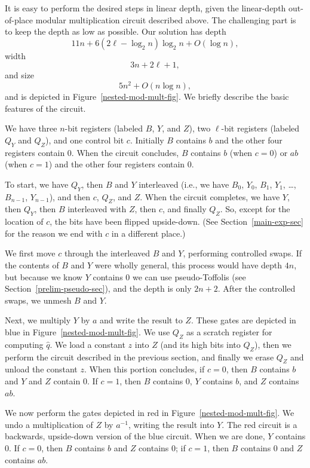 \documentclass{article} %
\begin{document}
It is easy to perform the desired steps in linear depth, given
the linear-depth out-of-place modular multiplication
circuit described above.  The challenging part is to keep the
depth as low as possible.  Our solution has depth
$$
11n + 6 (2\ell - \log_2 n) \log_2 n + O(\log n),
$$
width
$$
3n + 2\ell + 1,
$$
and size
$$
5n^2 + O(n \log n),
$$
and is depicted in Figure~\ref{nested-mod-mult-fig}.  We briefly
describe the basic features of the circuit.

We have three $n$-bit registers (labeled $B$, $Y$, and $Z$),
two $\ell$-bit registers (labeled $Q_Y$ and $Q_Z$), and one
control bit $c$.  Initially $B$ contains $b$ and the other
four registers contain $0$.  When the circuit concludes,
$B$ contains $b$ (when $c=0$) or $ab$ (when $c=1$) and the
other four registers contain $0$.

To start, we have $Q_Y$, then $B$ and $Y$ interleaved (i.e.,
we have $B_0$, $Y_0$, $B_1$, $Y_1$, \dots, $B_{n-1}$, $Y_{n-1}$),
and then $c$, $Q_Z$, and $Z$.  When the circuit completes,
we have $Y$, then $Q_Y$, then $B$ interleaved with $Z$, then
$c$, and finally $Q_Z$.  So, except for the location of $c$,
the bits have been flipped upside-down.  (See
Section~\ref{main-exp-sec} for the reason we end with $c$ in a
different place.)

We first move $c$ through the interleaved $B$ and $Y$,
performing controlled swaps.  If the contents of $B$ and $Y$ were
wholly general, this process would have depth $4n$, but because
we know $Y$ contains $0$ we can use pseudo-Toffolis (see
Section~\ref{prelim-pseudo-sec}), and the depth is only $2n+2$.
After the controlled swaps, we unmesh $B$ and $Y$.

Next, we multiply $Y$ by $a$ and write the result to $Z$.
These gates are depicted in blue in Figure~\ref{nested-mod-mult-fig}.
We use $Q_Z$ as a scratch register for computing $\hat{q}$.  We
load a constant $z$ into $Z$ (and its high bits into $Q_Z$), then
we perform the circuit described in the previous section, and
finally we erase $Q_Z$ and unload the constant $z$.  When this
portion concludes, if $c = 0$, then $B$ contains $b$ and $Y$ and
$Z$ contain $0$.  If $c = 1$, then $B$ contains $0$, $Y$ contains
$b$, and $Z$ contains $ab$.

We now perform the gates depicted in red in
Figure~\ref{nested-mod-mult-fig}.  We undo a multiplication
of $Z$ by $a^{-1}$, writing the result into $Y$.  The red circuit
is a backwards, upside-down version of the blue circuit.  When
we are done, $Y$ contains $0$.  If $c = 0$, then $B$
contains $b$ and $Z$ contains $0$; if $c = 1$, then $B$
contains $0$ and $Z$ contains $ab$.
\end{document}
